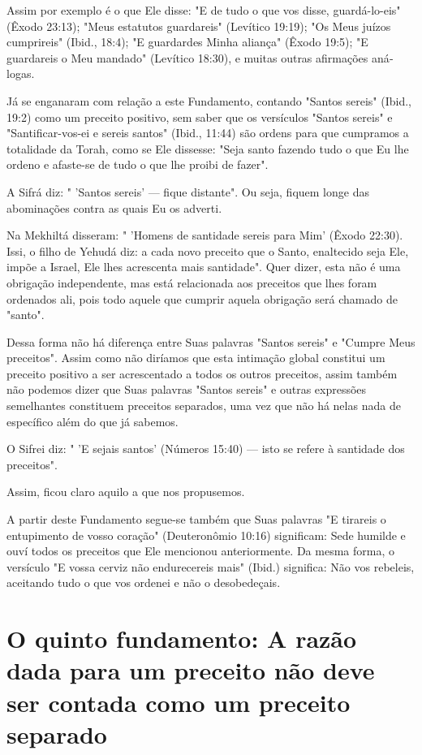 \begin{itemize}
\begin{enumrate}
Assim por exemplo é o que Ele disse: "E de tudo o que vos disse,
guardá-lo-eis" (Êxodo 23:13); "Meus estatutos guardareis" (Levítico
19:19); "Os Meus juízos cumprireis" (Ibid., 18:4); "E guardardes Minha
aliança" (Êxodo 19:5); "E guardareis o Meu mandado" (Levítico 18:30), e
muitas outras afirmações aná­logas.

Já se enganaram com relação a este Fundamento, contando "Santos sereis"
(Ibid., 19:2) como um preceito positivo, sem saber que os versículos
"Santos sereis" e "Santificar-vos-ei e sereis santos" (Ibid., 11:44) são
ordens para que cumpramos a totalidade da Torah, como se Ele dissesse:
"Seja santo fazendo tudo o que Eu lhe ordeno e afaste-se de tudo o que
lhe proibi de fazer".

A Sifrá diz: " 'Santos sereis' --- fique distante". Ou seja, fiquem
lon­ge das abominações contra as quais Eu os adverti.

Na Mekhiltá disseram: " 'Homens de santidade sereis para Mim' (Êxo­do
22:30). Issi, o filho de Yehudá diz: a cada novo preceito que o Santo,
enalte­cido seja Ele, impõe a Israel, Ele lhes acrescenta mais
santidade". Quer dizer, esta não é uma obrigação independente, mas está
relacionada aos preceitos que lhes foram ordenados ali, pois todo aquele
que cumprir aquela obrigação será chamado de "santo".

Dessa forma não há diferença entre Suas palavras "Santos sereis" e
"Cumpre Meus preceitos". Assim como não diríamos que esta intimação
glo­bal constitui um preceito positivo a ser acrescentado a todos os
outros precei­tos, assim também não podemos dizer que Suas palavras
"Santos sereis" e ou­tras expressões semelhantes constituem preceitos
separados, uma vez que não há nelas nada de específico além do que já
sabemos.

O Sifrei diz: " 'E sejais santos' (Números 15:40) --- isto se refere à
santidade dos preceitos".

Assim, ficou claro aquilo a que nos propusemos.

A partir deste Fundamento segue-se também que Suas palavras "E tirareis
o entupimento de vosso coração" (Deuteronômio 10:16) significam: Sede
humilde e ouví todos os preceitos que Ele mencionou anteriormente. Da
mes­ma forma, o versículo "E vossa cerviz não endurecereis mais" (Ibid.)
significa: Não vos rebeleis, aceitando tudo o que vos ordenei e não o
desobedeçais.

\chapter{O quinto fundamento: A razão dada para um 
preceito não deve ser contada como um preceito separado}


\end{enumrate}
\end{itemize}
